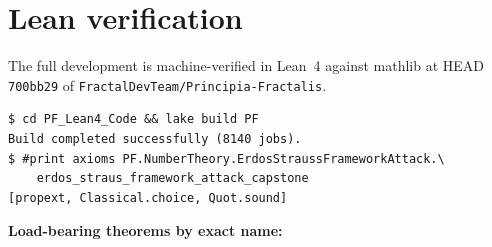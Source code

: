 \documentclass[11pt,a4paper]{article}
\theoremstyle{plain}
\theoremstyle{definition}
\begin{document}
\section{Lean verification}
\label{sec:lean}

The full development is machine-verified in Lean~4 against mathlib at
HEAD \texttt{700bb29} of \texttt{FractalDevTeam/Principia-Fractalis}.

\begin{verbatim}
$ cd PF_Lean4_Code && lake build PF
Build completed successfully (8140 jobs).
$ #print axioms PF.NumberTheory.ErdosStraussFrameworkAttack.\
    erdos_straus_framework_attack_capstone
[propext, Classical.choice, Quot.sound]
\end{verbatim}

\noindent\textbf{Load-bearing theorems by exact name:}
\end{document}
